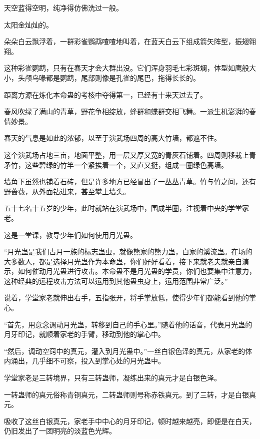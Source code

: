 
\begin{this_body}

天空蓝得空明，纯净得仿佛洗过一般。

太阳金灿灿的。

朵朵白云飘浮着，一群彩雀鹦鹉喳喳地叫着，在蓝天白云下组成箭矢阵型，振翅翱翔。

这种彩雀鹦鹉，只有在春天才会大群出没。它们浑身羽毛七彩斑斓，体型如鹰般大小，头颅鸟喙都是鹦鹉，尾部则像是孔雀的尾巴，拖得长长的。

距离方源在炼化本命蛊的考核中夺得第一，已经有十来天过去了。

春风吹绿了满山的青草，野花争相绽放，蜂群和蝶群交相飞舞。一派生机澎湃的春情妙景。

春天的气息是如此的浓郁，以至于演武场四周的高大竹墙，都遮不住。

这个演武场占地三亩，地面平整，用一层又厚又宽的青灰石铺着。四周则移栽上青矛竹，这些碧绿的竹竿一个紧挨着一个，又直又挺，组成一圈绿色高墙。

墙角下虽然也铺着石砖，但是许多地方已经冒出了一丛丛青草。竹与竹之间，还有野蔷薇，从外面钻进来，甚至攀上墙头。

五十七名十五岁的少年，此时就站在演武场中，围成半圈，注视着中央的学堂家老。

这是一堂课，教导少年们如何使用月光蛊。

“月光蛊是我们古月一族的标志蛊虫，就像熊家的熊力蛊，白家的溪流蛊。在场的大多数人，都是选择月光蛊作为本命蛊，你们好好看着，接下来就老夫就亲自演示，如何催动月光蛊进行攻击。本命蛊不是月光蛊的学员，你们也要集中注意力，这种经典的远程攻击方法可以运用到其他蛊虫身上，运用范围非常广泛。”

说着，学堂家老就伸出右手，五指张开，将手掌放低，使得少年们都能看到他的掌心。

“首先，用意念调动月光蛊，转移到自己的手心里。”随着他的话音，代表月光蛊的月牙印记，就顺着家老的手臂，移动到他的掌心中。

“然后，调动空窍中的真元，灌入到月光蛊中。”一丝白银色泽的真元，从家老的体内涌出，几乎细不可察，投入到掌心处的月光蛊中。

学堂家老是三转境界，只有三转蛊师，凝练出来的真元才是白银色泽。

一转蛊师的真元俗称青铜真元，二转蛊师则号称赤铁真元。到了三转，才是白银真元。

吸收了这丝白银真元，家老手中中心的月牙印记，顿时越来越亮，即便是在白天，仍旧发出了一团明亮的淡蓝色光辉。


\end{this_body}
